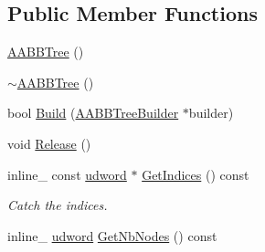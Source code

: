 \subsection*{Public Member Functions}
\begin{DoxyCompactItemize}
\item 
\hyperlink{classOpcode_1_1AABBTree_ad5b760ccbc90b5cfa5ba2b08231a00e4}{A\+A\+B\+B\+Tree} ()
\item 
\hyperlink{classOpcode_1_1AABBTree_a093aa9a3837c574f8779f36ce882332a}{$\sim$\+A\+A\+B\+B\+Tree} ()
\item 
bool \hyperlink{classOpcode_1_1AABBTree_a4cc7addadfb139b13288d09b7fe5f3ad}{Build} (\hyperlink{classOpcode_1_1AABBTreeBuilder}{A\+A\+B\+B\+Tree\+Builder} $\ast$builder)
\item 
void \hyperlink{classOpcode_1_1AABBTree_a5afb9bb2637b341242003ba2df1378f9}{Release} ()
\item 
inline\+\_\+ const \hyperlink{IceTypes_8h_a44c6f1920ba5551225fb534f9d1a1733}{udword} $\ast$ \hyperlink{classOpcode_1_1AABBTree_ab63e5f0004e0679d38c5bcd35970a0c7}{Get\+Indices} () const \hypertarget{classOpcode_1_1AABBTree_ab63e5f0004e0679d38c5bcd35970a0c7}{}\label{classOpcode_1_1AABBTree_ab63e5f0004e0679d38c5bcd35970a0c7}

\begin{DoxyCompactList}\small\item\em Catch the indices. \end{DoxyCompactList}\item 
inline\+\_\+ \hyperlink{IceTypes_8h_a44c6f1920ba5551225fb534f9d1a1733}{udword} \hyperlink{classOpcode_1_1AABBTree_a87ca01c4eac53b7b21cb20fddd9aa268}{Get\+Nb\+Nodes} () const \hypertarget{classOpcode_1_1AABBTree_a87ca01c4eac53b7b21cb20fddd9aa268}{}\label{classOpcode_1_1AABBTree_a87ca01c4eac53b7b21cb20fddd9aa268}


\end{DoxyCompactItemize}
